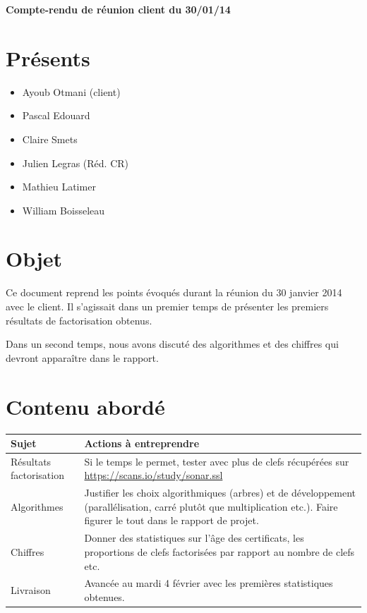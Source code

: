 \documentclass[a4paper,11pt,french]{article}
\author{\hmwkAuthorName}
\date{} %
\newcommand{\hmwkDocName}{Compte-rendu de réunion client du 30/01/14} %
\begin{document}
\pagestyle{fancy}

\begin{center}\textbf{\Huge{\hmwkDocName}}\end{center}
	
\section{Présents}
\begin{itemize}
\item Ayoub Otmani (client)
\item Pascal Edouard 
\item Claire Smets
\item Julien Legras (Réd. CR) 
\item Mathieu Latimer
\item William Boisseleau
\end{itemize}

\section{Objet}
Ce document reprend les points évoqués durant la réunion du 30 janvier 2014 avec le client. Il s'agissait dans un premier temps de présenter les premiers résultats de factorisation obtenus. 

Dans un second temps, nous avons discuté  des algorithmes et des chiffres qui devront apparaître dans le rapport.

\section{Contenu abordé}
\begin{center}

\begin{tabular}{ | l | p{14cm} |}
	\hline
   \textbf{Sujet} & \textbf{Actions à entreprendre}    \\ \hline
Résultats factorisation & Si le temps le permet, tester avec plus de clefs récupérées sur \url{https://scans.io/study/sonar.ssl}\\
 \hline
 Algorithmes & Justifier les choix algorithmiques (arbres) et de développement (parallélisation, carré plutôt que multiplication etc.). Faire figurer le tout dans le rapport de projet.\\
 \hline
Chiffres & Donner des statistiques sur l'âge des certificats, les proportions de clefs factorisées par rapport au nombre de clefs etc.\\
 \hline
 Livraison & Avancée au mardi 4 février avec les premières statistiques obtenues.\\
 \hline
 \end{tabular}
 
\end{center}
\end{document}
